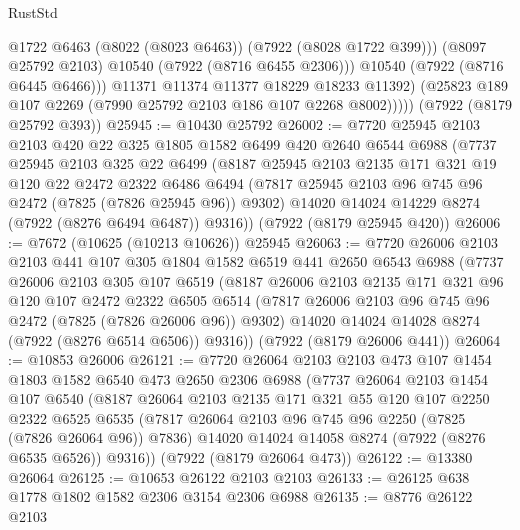 \begin{lexlean}{RustStd}
\begin{coremodule}
                  @1722
                  @6463
                  (@8022 (@8023 @6463))
                  (@7922 (@8028 @1722 @399)))
                (@8097 @25792 @2103)
                @10540
                (@7922 (@8716 @6455 @2306)))
              @10540
              (@7922 (@8716 @6445 @6466)))
            @11371
            @11374
            @11377
            @18229
            @18233
            @11392)
          (@25823 @189 @107 @2269 (@7990 @25792 @2103 @186 @107 @2268 @8002)))))
    (@7922 (@8179 @25792 @393))
@25945 := @10430 @25792
@26002 := @7720
    @25945
    @2103
    @2103
    @420
    @22
    @325
    @1805
    @1582
    @6499
    @420
    @2640
    @6544
    @6988
    (@7737
      @25945
      @2103
      @325
      @22
      @6499
      (@8187
        @25945
        @2103
        @2135
        @171
        @321
        @19
        @120
        @22
        @2472
        @2322
        @6486
        @6494
        (@7817 @25945 @2103 @96 @745 @96 @2472 (@7825 (@7826 @25945 @96)) @9302)
        @14020
        @14024
        @14229
        @8274
        (@7922 (@8276 @6494 @6487))
        @9316))
    (@7922 (@8179 @25945 @420))
@26006 := @7672 (@10625 (@10213 @10626)) @25945
@26063 := @7720
    @26006
    @2103
    @2103
    @441
    @107
    @305
    @1804
    @1582
    @6519
    @441
    @2650
    @6543
    @6988
    (@7737
      @26006
      @2103
      @305
      @107
      @6519
      (@8187
        @26006
        @2103
        @2135
        @171
        @321
        @96
        @120
        @107
        @2472
        @2322
        @6505
        @6514
        (@7817 @26006 @2103 @96 @745 @96 @2472 (@7825 (@7826 @26006 @96)) @9302)
        @14020
        @14024
        @14028
        @8274
        (@7922 (@8276 @6514 @6506))
        @9316))
    (@7922 (@8179 @26006 @441))
@26064 := @10853 @26006
@26121 := @7720
    @26064
    @2103
    @2103
    @473
    @107
    @1454
    @1803
    @1582
    @6540
    @473
    @2650
    @2306
    @6988
    (@7737
      @26064
      @2103
      @1454
      @107
      @6540
      (@8187
        @26064
        @2103
        @2135
        @171
        @321
        @55
        @120
        @107
        @2250
        @2322
        @6525
        @6535
        (@7817 @26064 @2103 @96 @745 @96 @2250 (@7825 (@7826 @26064 @96)) @7836)
        @14020
        @14024
        @14058
        @8274
        (@7922 (@8276 @6535 @6526))
        @9316))
    (@7922 (@8179 @26064 @473))
@26122 := @13380 @26064
@26125 := @10653 @26122 @2103 @2103
@26133 := @26125 @638 @1778 @1802 @1582 @2306 @3154 @2306 @6988
@26135 := @8776 @26122 @2103

\end{coremodule}
\end{lexlean}

